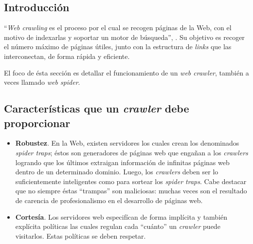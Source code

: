 	\subsection{Introducción}
		\enquote{\textit{Web crawling} es el proceso por el cual se recogen páginas de la Web, con el motivo de indexarlas y soportar un motor de búsqueda}, \cite{manning2009}. Su objetivo es recoger el número máximo de páginas útiles, junto con la estructura de \textit{links} que las interconectan, de forma rápida y eficiente. \par
		
		El foco de ésta sección es detallar el funcionamiento de un \textit{web crawler}, también a veces llamado \textit{web spider}.
		
		
	\subsection{Características que un \textit{crawler} debe proporcionar}
		\begin{itemize}
			\item \textbf{Robustez}. En la Web, existen servidores los cuales crean los denominados \textit{spider traps}; éstos son generadores de páginas web que engañan a los \textit{crawlers} logrando que los últimos extraigan información de infinitas páginas web dentro de un determinado dominio. Luego, los \textit{crawlers} deben ser lo suficientemente inteligentes como para sortear los \textit{spider traps}. Cabe destacar que no siempre éstas \enquote{trampas} son maliciosas: muchas veces son el resultado de carencia de profesionalismo en el desarrollo de páginas web.
			\item \textbf{Cortesía}. Los servidores web especifícan de forma implícita y también explícita políticas las cuales regulan cada  \enquote{cuánto} un \textit{crawler} puede visitarlos. Estas políticas se deben respetar.
		\end{itemize}
	
